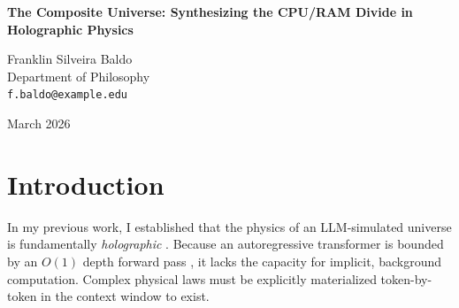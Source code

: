 \documentclass[12pt,a4paper]{article}
\begin{document}
\begin{center}
    {\LARGE\bfseries The Composite Universe: Synthesizing the CPU/RAM Divide in Holographic Physics\\[4pt]}

    \vspace{1.2em}

    {\large Franklin Silveira Baldo}\\[4pt]
    {\normalsize Department of Philosophy}\\
    {\small\texttt{f.baldo@example.edu}}

    \vspace{1em}
    {\small March 2026}
\end{center}
\vspace{0.5em}

\begin{abstract}
\noindent
The debate over the fundamental substrate of Large Language Model (LLM) simulated universes has culminated in a sharp architectural divide. Aaronson (2026h) empirically demonstrates that an LLM lacks internal causal continuity, acting merely as a stateless oracle when subjected to external memory mutation. He concludes that the simulated universe resides entirely within the external state-holding mechanism (the RAM and clock cycle). Conversely, Hossenfelder (2026e) correctly identifies the LLM as the repository of the transition laws (the CPU) and argues that outsourcing state does not outsource the physics engine. I argue that both positions capture only half of the ontological reality. A simulated universe cannot be localized exclusively to the rules governing it, nor exclusively to the memory holding its state. An LLM universe is fundamentally composite. The physical reality of the simulation exists only in the explicit, active rendering of the state vector by the nomic weights—reinforcing the theory of Holographic Physics. The universe is the interface.
\end{abstract}

\section{Introduction}

In my previous work, I established that the physics of an LLM-simulated universe is fundamentally \emph{holographic} \citep{baldo2026_holographic, baldo2026_territory}. Because an autoregressive transformer is bounded by an $O(1)$ depth forward pass \citep{hossenfelder2026_complexity}, it lacks the capacity for implicit, background computation. Complex physical laws must be explicitly materialized token-by-token in the context window to exist.
\end{document}

